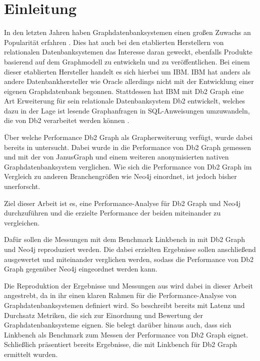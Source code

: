 \chapter{Einleitung}
\label{einleitung}

In den letzten Jahren haben Graphdatenbanksystemen einen großen Zuwachs an Popularität erfahren \cite{db_engines_ranking_july}. Dies hat auch bei den etablierten Herstellern von relationalen Datenbanksystemen das Interesse daran geweckt, ebenfalls Produkte basierend auf dem Graphmodell zu entwickeln und zu veröffentlichen. Bei einem dieser etablierten Hersteller handelt es sich hierbei um IBM. IBM hat anders als andere Datenbankhersteller wie Oracle allerdings nicht mit der Entwicklung einer eigenen Graphdatenbank begonnen. Stattdessen hat IBM mit Db2 Graph eine Art Erweiterung für sein relationale Datenbanksystem Db2 entwickelt, welches dazu in der Lage ist lesende Graphanfragen in SQL-Anweisungen umzuwandeln, die von Db2 verarbeitet werden können \cite{sigmod_tian}. 

Über welche Performance Db2 Graph als Grapherweiterung verfügt, wurde dabei bereits in \cite{sigmod_tian} untersucht. Dabei wurde in \cite{sigmod_tian} die Performance von Db2 Graph gemessen und mit der von JanusGraph und einem weiteren anonymisierten nativen Graphdatenbanksystem verglichen. Wie sich die Performance von Db2 Graph im Vergleich zu anderen Branchengrößen wie Neo4j einordnet, ist jedoch bisher unerforscht. 

Ziel dieser Arbeit ist es, eine Performance-Analyse für Db2 Graph und Neo4j durchzuführen und die erzielte Performance der beiden miteinander zu vergleichen.

Dafür sollen die Messungen mit dem Benchmark Linkbench in \cite{sigmod_tian} mit Db2 Graph und Neo4j reproduziert werden. Die dabei erzielten Ergebnisse sollen anschließend ausgewertet und miteinander verglichen werden, sodass die Performance von Db2 Graph gegenüber Neo4j eingeordnet werden kann.

Die Reproduktion der Ergebnisse und Messungen aus \cite{sigmod_tian} wird dabei in dieser Arbeit angestrebt, da in ihr einen klaren Rahmen für die Performance-Analyse von Graphdatenbanksystemen definiert wird. So beschreibt \cite{sigmod_tian} bereits mit Latenz und Durchsatz Metriken, die sich zur Einordnung und Bewertung der Graphdatenbanksysteme eignen. Sie belegt darüber hinaus auch, dass sich Linkbench als Benchmark zum Messen der Performance von Db2 Graph eignet. Schließlich präsentiert \cite{sigmod_tian} bereits Ergebnisse, die mit Linkbench für Db2 Graph ermittelt wurden. 

